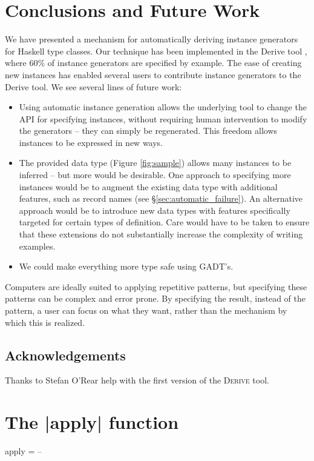 \documentclass[preprint]{sigplanconf}
\newcommand{\derive}{\textsc{Derive}}
\begin{document}
\section{Conclusions and Future Work}
\label{sec:conclusion}

We have presented a mechanism for automatically deriving instance generators for Haskell type classes. Our technique has been implemented in the Derive tool \cite{derive}, where 60\% of instance generators are specified by example. The ease of creating new instances has enabled several users to contribute instance generators to the Derive tool. We see several lines of future work:

\begin{itemize}
\item Using automatic instance generation allows the underlying tool to change the API for specifying instances, without requiring human intervention to modify the generators -- they can simply be regenerated. This freedom allows instances to be expressed in new ways.
\item The provided data type (Figure \ref{fig:sample}) allows many instances to be inferred -- but more would be desirable. One approach to specifying more instances would be to augment the existing data type with additional features, such as record names (see \S\ref{sec:automatic_failure}). An alternative approach would be to introduce new data types with features specifically targeted for certain types of definition. Care would have to be taken to ensure that these extensions do not substantially increase the complexity of writing examples.
\item We could make everything more type safe using GADT's.
\end{itemize}

Computers are ideally suited to applying repetitive patterns, but specifying these patterns can be complex and error prone. By specifying the result, instead of the pattern, a user can focus on what they want, rather than the mechanism by which this is realized.

\subsection*{Acknowledgements}

Thanks to Stefan O'Rear help with the first version of the \derive{} tool.





\appendix
\section{The |apply| function}

\begin{code}
apply = -- 
\end{code}
\end{document}
